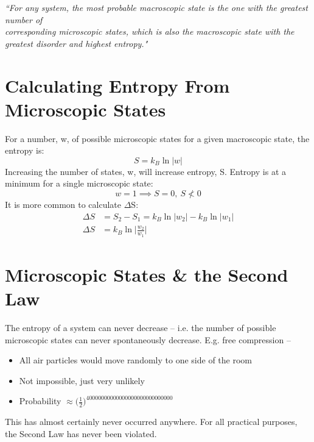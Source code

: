 \documentclass[a4paper, 11pt, normalem]{report}
\begin{document}
\emph{``For any system, the most probable macroscopic state is the one with the greatest number of \\ corresponding microscopic states, which is also the macroscopic state with the greatest disorder and highest entropy."}

\section{Calculating Entropy From Microscopic States}
For a number, w, of possible microscopic states for a given macroscopic state, the entropy is:
\begin{equation}
	S = k_{B}\ln{|w|}
\end{equation}
Increasing the number of states, w, will increase entropy, S.
Entropy is at a minimum for a single microscopic state:
\begin{equation}
	w = 1 \implies S = 0, ~ S \nless 0
\end{equation}
It is more common to calculate $\Delta$S:
\begin{align}
    {\Delta}S &= S_{2} - S_{1} = k_{B}\ln{|w_{2}|} - k_{B}\ln{|w_{1}|} \\
    {\Delta}S &= k_{B}\ln{\bigg|\frac{w_{2}}{w_{1}}\bigg|}
\end{align}

\section{Microscopic States \& the Second Law}
The entropy of a system can never decrease -- i.e. the number of possible microscopic states can never spontaneously decrease.
E.g. free compression --
\begin{itemize}
	\item All air particles would move randomly to one side of the room
	\item Not impossible, just very unlikely
	\item Probability $\approx \big(\frac{1}{2}\big)^{40000000000000000000000000000}$
\end{itemize}
This has almost certainly never occurred anywhere.
For all practical purposes, the Second Law has never been violated.
\end{document}
